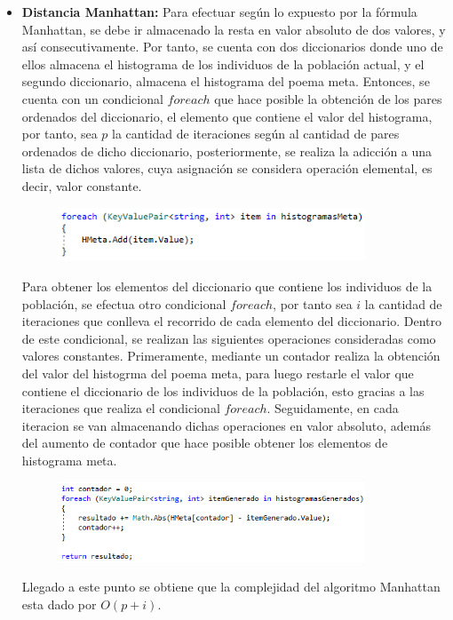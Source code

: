 \documentclass[journal]{IEEEtran}
\begin{document}
\begin{itemize}
	
	\item{\bf Distancia Manhattan:}
	Para efectuar según lo expuesto por la fórmula Manhattan, se debe ir almacenado la resta en valor absoluto de dos valores, y así consecutivamente. Por tanto, se cuenta con dos diccionarios donde uno de ellos almacena el histograma de los individuos de la población actual, y el segundo diccionario, almacena el histograma del poema meta. Entonces, se cuenta con un condicional $ foreach $ que hace posible la obtención de los pares ordenados del diccionario, el elemento que contiene el valor del histograma, por tanto, sea $ p $ la cantidad de iteraciones según al cantidad de pares ordenados de dicho diccionario, posteriormente, se realiza la adicción a una lista de dichos valores, cuya asignación se considera operación elemental, es decir, valor constante.
	
	\begin{figure}[h]
		\centering
		\includegraphics[width = 260pt]{Manhattan1.png}
		\caption{ }
	\end{figure} 
	
	Para obtener los elementos del diccionario que contiene los individuos de la población, se efectua otro condicional $ foreach $, por tanto sea $ i $ la cantidad de iteraciones que conlleva el recorrido de cada elemento del diccionario. Dentro de este condicional, se realizan las siguientes operaciones consideradas como valores constantes. Primeramente, mediante un contador realiza la obtención del valor del histogrma del poema meta, para luego restarle el valor que contiene el diccionario de los individuos de la población, esto gracias a las iteraciones que realiza el condicional $ foreach $. Seguidamente, en cada iteracion se van almacenando dichas operaciones en valor absoluto, además del aumento de contador que hace posible obtener los elementos de histograma meta.
	
	\begin{figure}[h]
		\centering
		\includegraphics[width = 260pt]{Manhattan2.png}
		\caption{ }
	\end{figure}
	
	Llegado a este punto se obtiene que la complejidad del algoritmo Manhattan esta dado por $ O(p + i) $. \\
	
	
\end{itemize}
\end{document}
